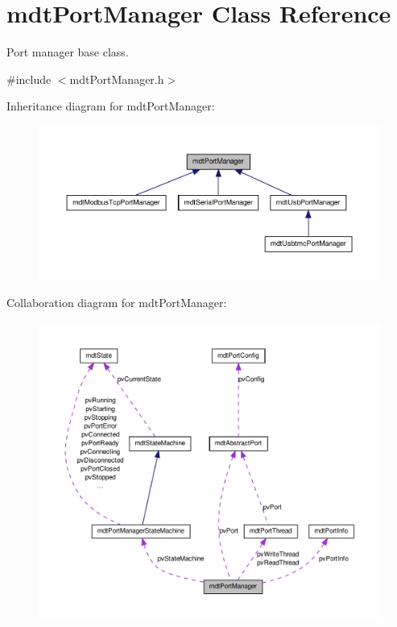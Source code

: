 \hypertarget{classmdt_port_manager}{
\section{mdtPortManager Class Reference}
\label{classmdt_port_manager}
}


Port manager base class.  




{\ttfamily \#include $<$mdtPortManager.h$>$}



Inheritance diagram for mdtPortManager:\nopagebreak
\begin{figure}[H]
\begin{center}
\leavevmode
\includegraphics[width=400pt]{classmdt_port_manager__inherit__graph}
\end{center}
\end{figure}


Collaboration diagram for mdtPortManager:\nopagebreak
\begin{figure}[H]
\begin{center}
\leavevmode
\includegraphics[width=400pt]{classmdt_port_manager__coll__graph}
\end{center}
\end{figure}
